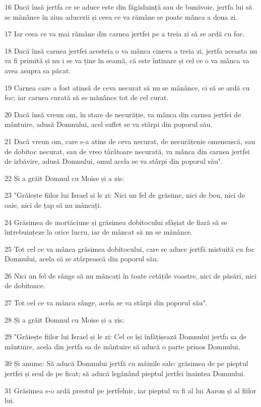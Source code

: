 \par 16 Dacă însă jertfa ce se aduce este din făgăduință sau de bunăvoie, jertfa lui să se mănânce în ziua aducerii și ceea ce va rămâne se poate mânca a doua zi.
\par 17 Iar ceea ce va mai rămâne din carnea jertfei pe a treia zi să se ardă cu foc.
\par 18 Dacă însă carnea jertfei acesteia o va mânca cineva a treia zi, jertfa aceasta nu va fi primită și nu i se va ține în seamă, că este întinare și cel ce o va mânca va avea asupra sa păcat.
\par 19 Carnea care a fost atinsă de ceva necurat să nu se mănânce, ci să se ardă cu foc; iar carnea curată să se mănânce tot de cel curat.
\par 20 Dacă însă vreun om, în stare de necurăție, va mânca din carnea jertfei de mântuire, adusă Domnului, acel suflet se va stârpi din poporul său.
\par 21 Dacă vreun om, care s-a atins de ceva necurat, de necurățenie omenească, sau de dobitoc necurat, sau de vreo târâtoare necurată, va mânca din carnea jertfei de izbăvire, adusă Domnului, omul acela se va stârpi din poporul său".
\par 22 Și a grăit Domnul cu Moise și a zis:
\par 23 "Grăiește fiilor lui Israel și le zi: Nici un fel de grăsime, nici de bou, nici de oaie, nici de țap să nu mâncați.
\par 24 Grăsimea de mortăciune și grăsimea dobitocului sfâșiat de fiară să se întrebuințeze la orice lucru, iar de mâncat să nu se mănânce.
\par 25 Tot cel ce va mânca grăsimea dobitocului, care se aduce jertfă mistuită cu foc Domnului, acela să se stârpească din poporul său.
\par 26 Nici un fel de sânge să nu mâncați în toate cetățile voastre, nici de păsări, nici de dobitoace.
\par 27 Tot cel ce va mânca sânge, acela se va stârpi din poporul său".
\par 28 Și a grăit Domnul cu Moise și a zis:
\par 29 "Grăiește fiilor lui Israel și le zi: Cel ce își înfățișează Domnului jertfa sa de mântuire, acela din jertfa sa de mântuire să aducă o parte prinos Domnului,
\par 30 Și anume: Să aducă Domnului jertfă cu mâinile sale: grăsimea de pe pieptul jertfei și seul de pe ficat; să aducă legănând pieptul jertfei înaintea Domnului.
\par 31 Grăsimea s-o ardă preotul pe jertfelnic, iar pieptul va fi al lui Aaron și al fiilor lui.
